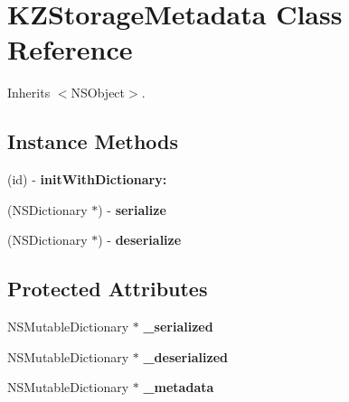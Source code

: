 \hypertarget{interface_k_z_storage_metadata}{\section{K\-Z\-Storage\-Metadata Class Reference}
\label{interface_k_z_storage_metadata}
}


Inherits $<$\-N\-S\-Object$>$.

\subsection*{Instance Methods}
\begin{DoxyCompactItemize}
\item 
\hypertarget{interface_k_z_storage_metadata_a2bae73c2f58e5beb77cdfc562865b67d}{(id) -\/ {\bfseries init\-With\-Dictionary\-:}}\label{interface_k_z_storage_metadata_a2bae73c2f58e5beb77cdfc562865b67d}

\item 
\hypertarget{interface_k_z_storage_metadata_a8451301fc23e7c8e3274e9d10abc10ea}{(N\-S\-Dictionary $\ast$) -\/ {\bfseries serialize}}\label{interface_k_z_storage_metadata_a8451301fc23e7c8e3274e9d10abc10ea}

\item 
\hypertarget{interface_k_z_storage_metadata_ad2fc47cc59349f83cb54f7d0d85a98c4}{(N\-S\-Dictionary $\ast$) -\/ {\bfseries deserialize}}\label{interface_k_z_storage_metadata_ad2fc47cc59349f83cb54f7d0d85a98c4}

\end{DoxyCompactItemize}
\subsection*{Protected Attributes}
\begin{DoxyCompactItemize}
\item 
\hypertarget{interface_k_z_storage_metadata_a6bc173e1f9445f44c1a6c14a275a369c}{N\-S\-Mutable\-Dictionary $\ast$ {\bfseries \-\_\-serialized}}\label{interface_k_z_storage_metadata_a6bc173e1f9445f44c1a6c14a275a369c}

\item 
\hypertarget{interface_k_z_storage_metadata_abd1a75811c73d6f2116cde434ce53522}{N\-S\-Mutable\-Dictionary $\ast$ {\bfseries \-\_\-deserialized}}\label{interface_k_z_storage_metadata_abd1a75811c73d6f2116cde434ce53522}

\item 
\hypertarget{interface_k_z_storage_metadata_a3539f534896f4574036cd0917068c06a}{N\-S\-Mutable\-Dictionary $\ast$ {\bfseries \-\_\-metadata}}\label{interface_k_z_storage_metadata_a3539f534896f4574036cd0917068c06a}

\end{DoxyCompactItemize}
